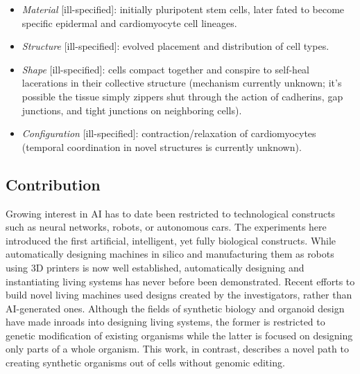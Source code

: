 \begin{itemize}
    \item \textit{Material} [ill-specified]: initially pluripotent stem cells, later fated to become specific epidermal and cardiomyocyte cell lineages.
    \item \textit{Structure} [ill-specified]: evolved placement and distribution of cell types.
    \item \textit{Shape} [ill-specified]: cells compact together and conspire to self-heal lacerations in their collective structure (mechanism currently unknown; it's possible the tissue simply zippers shut through the action of cadherins, gap junctions, and tight junctions on neighboring cells).
    
    \item \textit{Configuration} [ill-specified]: contraction/relaxation of cardiomyocytes (temporal coordination in novel structures is currently unknown).
\end{itemize}


\subsection{Contribution}

Growing interest in AI has to date been restricted to technological constructs such as neural networks, robots, or autonomous cars. 
The experiments here
introduced the first artificial, intelligent, yet fully biological constructs. 
While automatically designing machines in silico and manufacturing them as robots using 3D printers is now well established, automatically designing and instantiating living systems has never before been demonstrated. 
Recent efforts to build novel living machines \cite{herr2004swimming,xi2005self,feinberg2007muscular,cvetkovic2014three,raman2016optogenetic,nawroth2012tissue,park2016phototactic,ricotti2017biohybrid} used designs created by the investigators, rather than AI-generated ones.
Although the fields of synthetic biology and organoid design have made inroads into designing living systems, the former is restricted to genetic modification of existing organisms while the latter is focused on designing only parts of a whole organism.
This work, in contrast, describes a novel path to creating synthetic organisms out of cells without genomic editing.

